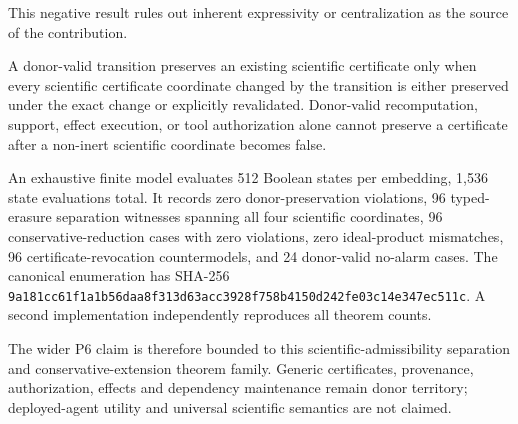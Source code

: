 This negative result rules out inherent expressivity or centralization as the
source of the contribution.

\begin{theorem}
A donor-valid transition preserves an existing scientific certificate only when
every scientific certificate coordinate changed by the transition is either
preserved under the exact change or explicitly revalidated.  Donor-valid
recomputation, support, effect execution, or tool authorization alone cannot
preserve a certificate after a non-inert scientific coordinate becomes false.
\end{theorem}

An exhaustive finite model evaluates 512 Boolean states per embedding, 1,536
state evaluations total.  It records zero donor-preservation violations, 96
typed-erasure separation witnesses spanning all four scientific coordinates,
96 conservative-reduction cases with zero violations, zero ideal-product
mismatches, 96 certificate-revocation countermodels, and 24 donor-valid
no-alarm cases.  The canonical enumeration has SHA-256
\texttt{9a181cc61f1a1b56daa8f313d63acc3928f758b4150d242fe03c14e347ec511c}.
A second implementation independently reproduces all theorem counts.

The wider P6 claim is therefore bounded to this scientific-admissibility
separation and conservative-extension theorem family.  Generic certificates,
provenance, authorization, effects and dependency maintenance remain donor
territory; deployed-agent utility and universal scientific semantics are not
claimed.
